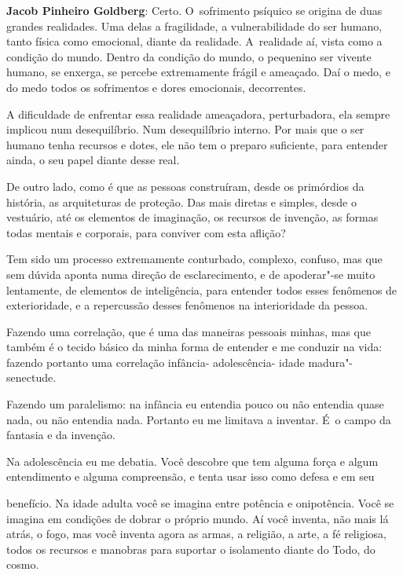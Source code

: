  

\textbf{Jacob Pinheiro Goldberg}: Certo. O~sofrimento psíquico se
origina de duas grandes realidades. Uma delas a fragilidade, a
vulnerabilidade do ser humano, tanto física como emocional, diante da
realidade. A~realidade aí, vista como a condição do mundo. Dentro da
condição do mundo, o pequenino ser vivente humano, se enxerga, se
percebe extremamente frágil e ameaçado. Daí o medo, e do medo todos os
sofrimentos e dores emocionais, decorrentes.

 

A dificuldade de enfrentar essa realidade ameaçadora, perturbadora, ela
sempre implicou num desequilíbrio. Num desequilíbrio interno. Por mais
que o ser humano tenha recursos e dotes, ele não tem o preparo
suficiente, para entender ainda, o seu papel diante desse real.

 

De outro lado, como é que as pessoas construíram, desde os primórdios da
história, as arquiteturas de proteção. Das mais diretas e simples, desde
o vestuário, até os elementos de imaginação, os recursos de invenção, as
formas todas mentais e corporais, para conviver com esta aflição?

 

Tem sido um processo extremamente conturbado, complexo, confuso, mas que
sem dúvida aponta numa direção de esclarecimento, e de apoderar"-se muito
lentamente, de elementos de inteligência, para entender todos esses
fenômenos de exterioridade, e a repercussão desses fenômenos na
interioridade da pessoa.

 

Fazendo uma correlação, que é uma das maneiras pessoais minhas, mas que
também é o tecido básico da minha forma de entender e me conduzir na
vida: fazendo portanto uma correlação infância- adolescência- idade
madura"-senectude.

 

Fazendo um paralelismo: na infância eu entendia pouco ou não entendia
quase nada, ou não entendia nada. Portanto eu me limitava a inventar. É~o campo da fantasia e da invenção.

 

Na adolescência eu me debatia. Você descobre que tem alguma força e
algum entendimento e alguma compreensão, e tenta usar isso como defesa e
em seu

benefício. Na idade adulta você se imagina entre potência e onipotência.
Você se imagina em condições de dobrar o próprio mundo. Aí você inventa,
não mais lá atrás, o fogo, mas você inventa agora as armas, a religião,
a arte, a fé religiosa, todos os recursos e manobras para suportar o
isolamento diante do Todo, do cosmo.

